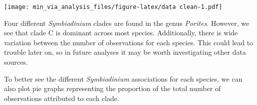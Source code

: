 \documentclass[]{article}
\newenvironment{Shaded}{\begin{snugshade}}{\end{snugshade}}
\newcommand{\KeywordTok}[1]{\textcolor[rgb]{0.13,0.29,0.53}{\textbf{#1}}}
\newcommand{\DataTypeTok}[1]{\textcolor[rgb]{0.13,0.29,0.53}{#1}}
\newcommand{\DecValTok}[1]{\textcolor[rgb]{0.00,0.00,0.81}{#1}}
\newcommand{\FloatTok}[1]{\textcolor[rgb]{0.00,0.00,0.81}{#1}}
\newcommand{\StringTok}[1]{\textcolor[rgb]{0.31,0.60,0.02}{#1}}
\newcommand{\CommentTok}[1]{\textcolor[rgb]{0.56,0.35,0.01}{\textit{#1}}}
\newcommand{\OperatorTok}[1]{\textcolor[rgb]{0.81,0.36,0.00}{\textbf{#1}}}
\newcommand{\NormalTok}[1]{#1}
\begin{document}
\texttt{[image: min\_via\_analysis\_files/figure-latex/data clean-1.pdf]}

Four different \emph{Symbiodinium} clades are found in the genus
\emph{Porites}. However, we see that clade C is dominant across most
species. Additionally, there is wide variation between the number of
observations for each species. This could lead to trouble later on, so
in future analyses it may be worth investigating other data sources.

To better see the different \emph{Symbiodinium} associations for each
species, we can also plot pie graphs representing the proportion of the
total number of observations attributed to each clade.

\begin{Shaded}
\end{Shaded}
\end{document}
